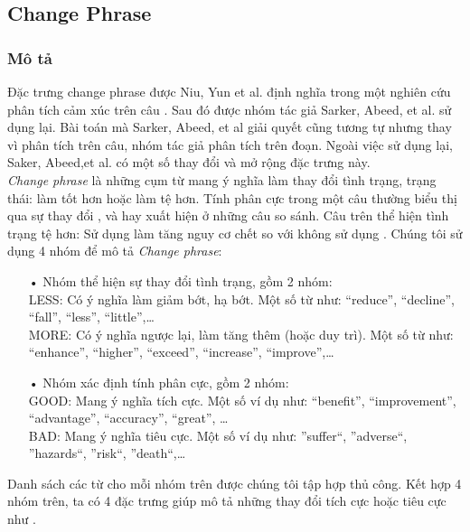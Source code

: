 \subsection{Change Phrase}
\subsubsection*{Mô tả}
Đặc trưng change phrase được Niu, Yun et al. định nghĩa trong một nghiên cứu phân tích cảm xúc trên câu \cite{niu2005analysis}. Sau đó được nhóm tác giả Sarker, Abeed, et al. sử dụng lại. Bài toán mà Sarker, Abeed, et al giải quyết cũng tương tự nhưng thay vì phân tích trên câu, nhóm tác giả phân tích trên đoạn. Ngoài việc sử dụng lại, Saker, Abeed,et al. có một số thay đổi và mở rộng đặc trưng này.\\

\textit{Change phrase} là những cụm từ mang ý nghĩa làm thay đổi tình trạng, trạng thái: làm tốt hơn hoặc làm tệ hơn. Tính phân cực trong một câu thường biểu thị qua sự thay đổi \cite{niu2005analysis}, và hay xuất hiện ở những câu so sánh.
Câu trên thể hiện tình trạng tệ hơn: Sử dụng  làm tăng nguy cơ chết so với không sử dụng .
Chúng tôi sử dụng 4 nhóm để mô tả \textit{Change phrase}:
\begin{itemize}
\item[•]Nhóm thể hiện sự thay đổi tình trạng, gồm 2 nhóm:\\
LESS: Có ý nghĩa làm giảm bớt, hạ bớt. Một số từ như: ``reduce'', ``decline'', ``fall'', ``less'', ``little'',\ldots \\
MORE: Có ý nghĩa ngược lại, làm tăng thêm (hoặc duy trì). Một số từ như: ``enhance'', ``higher'', ``exceed'', ``increase'', ``improve'',\ldots
\item[•]Nhóm xác định tính phân cực, gồm 2 nhóm:\\
GOOD: Mang ý nghĩa tích cực. Một số ví dụ như: ``benefit'', ``improvement'', ``advantage'', ``accuracy'', ``great'', \ldots\\
BAD: Mang ý nghĩa tiêu cực. Một số ví dụ như: ''suffer``, ''adverse``, ''hazards``, ''risk``, ''death``,\ldots
\end{itemize}
Danh sách các từ cho mỗi nhóm trên được chúng tôi tập hợp thủ công. Kết hợp 4 nhóm trên, ta có 4 đặc trưng giúp mô tả những thay đổi tích cực hoặc tiêu cực như .
